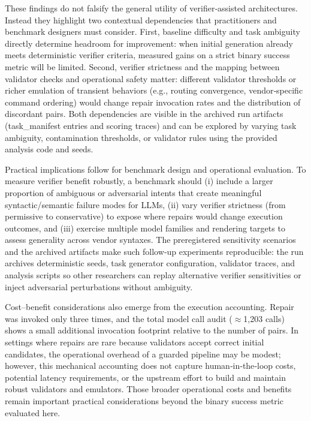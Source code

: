 \documentclass[conference]{IEEEtran}
\begin{document}
These findings do not falsify the general utility of verifier‑assisted architectures. Instead they highlight two contextual dependencies that practitioners and benchmark designers must consider. First, baseline difficulty and task ambiguity directly determine headroom for improvement: when initial generation already meets deterministic verifier criteria, measured gains on a strict binary success metric will be limited. Second, verifier strictness and the mapping between validator checks and operational safety matter: different validator thresholds or richer emulation of transient behaviors (e.g., routing convergence, vendor‑specific command ordering) would change repair invocation rates and the distribution of discordant pairs. Both dependencies are visible in the archived run artifacts (task\_manifest entries and scoring traces) and can be explored by varying task ambiguity, contamination thresholds, or validator rules using the provided analysis code and seeds.

Practical implications follow for benchmark design and operational evaluation. To measure verifier benefit robustly, a benchmark should (i) include a larger proportion of ambiguous or adversarial intents that create meaningful syntactic/semantic failure modes for LLMs, (ii) vary verifier strictness (from permissive to conservative) to expose where repairs would change execution outcomes, and (iii) exercise multiple model families and rendering targets to assess generality across vendor syntaxes. The preregistered sensitivity scenarios and the archived artifacts make such follow‑up experiments reproducible: the run archives deterministic seeds, task generator configuration, validator traces, and analysis scripts so other researchers can replay alternative verifier sensitivities or inject adversarial perturbations without ambiguity.

Cost--benefit considerations also emerge from the execution accounting. Repair was invoked only three times, and the total model call audit (\ensuremath{\approx}1,203 calls) shows a small additional invocation footprint relative to the number of pairs. In settings where repairs are rare because validators accept correct initial candidates, the operational overhead of a guarded pipeline may be modest; however, this mechanical accounting does not capture human‑in‑the‑loop costs, potential latency requirements, or the upstream effort to build and maintain robust validators and emulators. Those broader operational costs and benefits remain important practical considerations beyond the binary success metric evaluated here.
\end{document}
